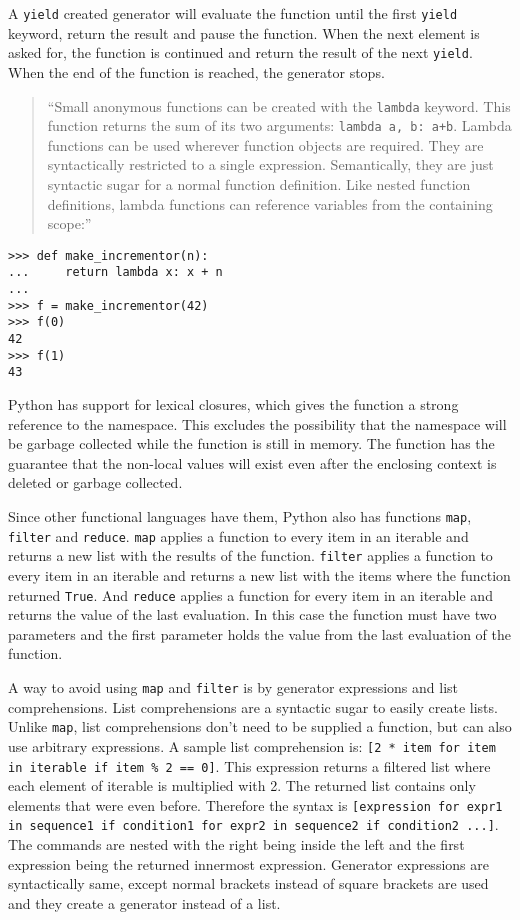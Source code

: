 A \verb;yield; created generator will evaluate the function until the first
\verb;yield; keyword, return the result and pause the function. When the next
element is asked for, the function is continued and return the result of the
next \verb;yield;. When the end of the function is reached, the generator stops.

\begin{quote}
``Small anonymous functions can be created with the \verb;lambda; keyword. This
function returns the sum of its two arguments: \verb;lambda a, b: a+b;. Lambda
functions can be used wherever function objects are required. They are syntactically restricted to a single expression. Semantically, they are just syntactic sugar for a normal function definition. Like nested function definitions, lambda functions can reference variables from the containing scope:''\cite[4.7.5. Lambda Expressions]{website:python-functions}
\end{quote}
\begin{verbatim}
>>> def make_incrementor(n):
...     return lambda x: x + n
...
>>> f = make_incrementor(42)
>>> f(0)
42
>>> f(1)
43
\end{verbatim}

Python has support for lexical closures, which gives the function a strong
reference to the namespace. This excludes the possibility that the namespace will be garbage
collected while the function is still in memory. The function has the guarantee
that the non-local values will exist even after the enclosing context is deleted
or garbage collected.\cite{website:python-closures}

Since other functional languages have them, Python also has functions
\verb;map;, \verb;filter; and \verb;reduce;. \verb;map; applies a function
to every item in an iterable and returns a new list with the results of the
function. \verb;filter; applies a function to every item in an iterable and
returns a new list with the items where the function returned \verb;True;. And \verb;reduce; applies a function for every item in an iterable and returns the value of the last evaluation. In this case the function must have two parameters and the first parameter holds the value from the last evaluation of the function.

A way to avoid using \verb;map; and \verb;filter; is by generator expressions
and list comprehensions. List comprehensions are a syntactic sugar to easily
create lists. Unlike \verb;map;, list comprehensions don't need to be supplied a
function, but can also use arbitrary expressions. A sample list comprehension
is: \verb;[2 * item for item in iterable if item % 2 == 0];. This expression
returns a filtered list where each element of iterable is multiplied with 2. The
returned list contains only elements that were even before. Therefore the syntax
is
\verb;[expression for expr1 in sequence1 if condition1 for expr2 in sequence2 if condition2 ...];.
The commands are nested with the right being inside the left and the first expression being the returned innermost expression. Generator expressions are syntactically same, except normal brackets instead of square brackets are used and they create a generator instead of a
list.

